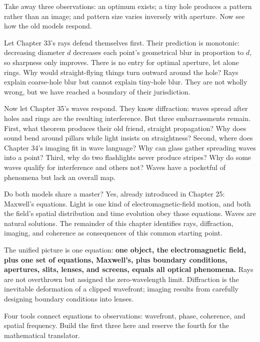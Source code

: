 Take away three observations: an optimum exists; a tiny hole produces a pattern rather than an image; and pattern size varies inversely with aperture. Now see how the old models respond.


Let Chapter 33's rays defend themselves first. Their prediction is monotonic: decreasing diameter \(d\) decreases each point's geometrical blur in proportion to \(d\), so sharpness only improves. There is no entry for optimal aperture, let alone rings. Why would straight-flying things turn outward around the hole? Rays explain coarse-hole blur but cannot explain tiny-hole blur. They are not wholly wrong, but we have reached a boundary of their jurisdiction.

Now let Chapter 35's waves respond. They know diffraction: waves spread after holes and rings are the resulting interference. But three embarrassments remain. First, what theorem produces their old friend, straight propagation? Why does sound bend around pillars while light insists on straightness? Second, where does Chapter 34's imaging fit in wave language? Why can glass gather spreading waves into a point? Third, why do two flashlights never produce stripes? Why do some waves qualify for interference and others not? Waves have a pocketful of phenomena but lack an overall map.

Do both models share a master? Yes, already introduced in Chapter 25: Maxwell's equations. Light is one kind of electromagnetic-field motion, and both the field's spatial distribution and time evolution obey those equations. Waves are natural solutions. The remainder of this chapter identifies rays, diffraction, imaging, and coherence as consequences of this common starting point.

\begin{mainline}
The unified picture is one equation: \textbf{one object, the electromagnetic field, plus one set of equations, Maxwell's, plus boundary conditions, apertures, slits, lenses, and screens, equals all optical phenomena.} Rays are not overthrown but assigned the zero-wavelength limit. Diffraction is the inevitable deformation of a clipped wavefront; imaging results from carefully designing boundary conditions into lenses.
\end{mainline}


Four tools connect equations to observations: wavefront, phase, coherence, and spatial frequency. Build the first three here and reserve the fourth for the mathematical translator.

